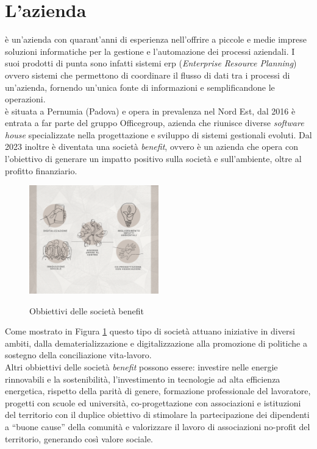 \section{L'azienda}
{\company} è un'azienda con quarant'anni di esperienza nell'offrire a piccole e medie imprese soluzioni informatiche per la 
gestione e l'automazione dei processi aziendali. I suoi prodotti di punta sono infatti sistemi \gls{erp} (\textit{Enterprise 
Resource Planning}) ovvero sistemi che permettono di coordinare il flusso di dati tra i processi di un'azienda, fornendo un'unica fonte di 
informazioni e semplificandone le operazioni.\\
{\company} è situata a Pernumia (Padova) e opera in prevalenza nel Nord Est, dal 2016 è entrata a far parte del gruppo Officegroup, azienda 
che riunisce diverse \textit{software house} specializzate nella progettazione e sviluppo di sistemi gestionali evoluti. 
Dal 2023 inoltre è diventata una società \textit{benefit}, ovvero è un azienda che opera con l'obiettivo di generare un impatto positivo 
sulla società e sull'ambiente, oltre al profitto finanziario.

\begin{figure}[H]
    \centering
    \includegraphics[alt={Obbiettivi delle società benefit}, width=0.5\textwidth]{img/soc-benefit.png}
    \caption{Obbiettivi delle società benefit}
    \label{fig:società benefit}
\end{figure}

Come mostrato in Figura \ref{fig:società benefit} questo tipo di società attuano iniziative in diversi ambiti, dalla dematerializzazione 
e digitalizzazione alla promozione di politiche a sostegno della conciliazione vita-lavoro.\\
Altri obbiettivi delle società \textit{benefit} possono essere: investire nelle energie rinnovabili e la sostenibilità, l'investimento in tecnologie 
ad alta efficienza energetica, rispetto della parità di genere, formazione professionale del lavoratore, progetti con scuole ed 
università, co-progettazione con associazioni e istituzioni del territorio con il duplice obiettivo di stimolare la partecipazione dei dipendenti 
a “buone cause” della comunità e valorizzare il lavoro di associazioni no-profit del territorio, generando così valore sociale.

